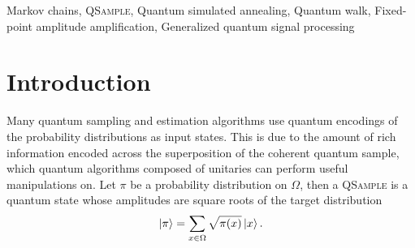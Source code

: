 \documentclass[10pt,conference]{IEEEtran}
\theoremstyle{plain}
\theoremstyle{remark}
\begin{document}
\begin{IEEEkeywords}
Markov chains, \textsc{QSample}, Quantum simulated annealing, Quantum walk, Fixed-point amplitude amplification, Generalized quantum signal processing
\end{IEEEkeywords}


\section{Introduction}
\label{sec:introduction}
 Many quantum sampling and estimation algorithms use quantum encodings of the probability distributions as input states. This is due to the amount of rich information encoded across the superposition of the coherent quantum sample, which quantum algorithms composed of unitaries can perform useful manipulations on. Let \(\pi\) be a probability distribution on \(\Omega\), then a \textsc{QSample} is a quantum state whose amplitudes are square roots of the target distribution
\begin{equation}
\ket{\pi}
=
\sum_{x\in\Omega}\sqrt{\pi(x)}\ket{x}.
\end{equation}
\end{document}
